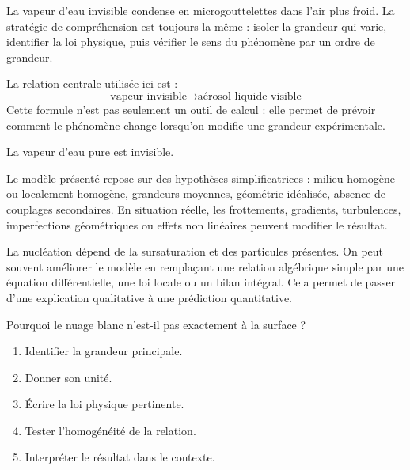 \documentclass[11pt,a4paper]{article}
\begin{document}
\begin{methodebox}
La vapeur d'eau invisible condense en microgouttelettes dans l'air plus froid.
La stratégie de compréhension est toujours la même : isoler la grandeur qui varie, identifier la loi physique, puis vérifier le sens du phénomène par un ordre de grandeur.
\end{methodebox}

\begin{theorembox}
La relation centrale utilisée ici est :
\[
\text{vapeur invisible}\rightarrow\text{aérosol liquide visible}
\]
Cette formule n'est pas seulement un outil de calcul : elle permet de prévoir comment le phénomène change lorsqu'on modifie une grandeur expérimentale.
\end{theorembox}

\begin{odgbox}
La vapeur d'eau pure est invisible.
\end{odgbox}

\begin{attentionbox}
Le modèle présenté repose sur des hypothèses simplificatrices : milieu homogène ou localement homogène, grandeurs moyennes, géométrie idéalisée, absence de couplages secondaires. En situation réelle, les frottements, gradients, turbulences, imperfections géométriques ou effets non linéaires peuvent modifier le résultat.
\end{attentionbox}

\begin{approfondissementbox}
La nucléation dépend de la sursaturation et des particules présentes.
On peut souvent améliorer le modèle en remplaçant une relation algébrique simple par une équation différentielle, une loi locale ou un bilan intégral. Cela permet de passer d'une explication qualitative à une prédiction quantitative.
\end{approfondissementbox}

\begin{exercicebox}
Pourquoi le nuage blanc n'est-il pas exactement à la surface ?
\begin{enumerate}
  \item Identifier la grandeur principale.
  \item Donner son unité.
  \item Écrire la loi physique pertinente.
  \item Tester l'homogénéité de la relation.
  \item Interpréter le résultat dans le contexte.
\end{enumerate}
\end{exercicebox}
\end{document}
